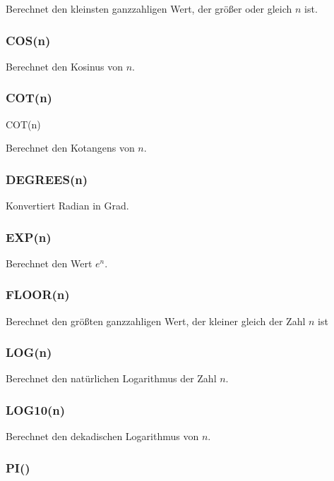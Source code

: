 \documentclass[12pt,ngerman,a4paper,index=totoc,twoside]{scrartcl}
\begin{document}
Berechnet den kleinsten ganzzahligen Wert, der größer oder gleich $n$ ist.

\subsubsection{COS(n)}

Berechnet den Kosinus von $n$.

\subsubsection{COT(n)}COT(n)

Berechnet den Kotangens von $n$.

\subsubsection{DEGREES(n)}

Konvertiert Radian in Grad.

\subsubsection{EXP(n)}

Berechnet den Wert $e^n$.

\subsubsection{FLOOR(n)}

Berechnet den größten ganzzahligen Wert, der kleiner gleich der Zahl $n$ ist

\subsubsection{LOG(n)}

Berechnet den natürlichen Logarithmus der Zahl $n$.

\subsubsection{LOG10(n)}

Berechnet den dekadischen Logarithmus von $n$.


\subsubsection{PI()}
\end{document}
